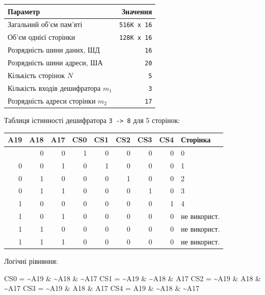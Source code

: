 \documentclass[
  11pt,
]{article}
\newenvironment{Shaded}{}{}
\newcommand{\NormalTok}[1]{#1}
\newcounter{none} %
\begin{document}
\begin{enumerate}
  {\def\LTcaptype{none}
  \begin{longtable}[]{@{}lr@{}}
  \toprule\noalign{}
  Параметр & Значення \\
  \midrule\noalign{}
  \endhead
  \bottomrule\noalign{}
  \endlastfoot
  Загальний об'єм пам'яті & \texttt{516K\ x\ 16} \\
  Об'єм однієї сторінки & \texttt{128K\ x\ 16} \\
  Розрядність шини даних, ШД & \texttt{16} \\
  Розрядність шини адреси, ША & \texttt{20} \\
  Кількість сторінок \(N\) & \texttt{5} \\
  Кількість входів дешифратора \(m_1\) & \texttt{3} \\
  Розрядність адреси сторінки \(m_2\) & \texttt{17} \\
  \end{longtable}
  }

  Таблиця істинності дешифратора \texttt{3\ -\textgreater{}\ 8} для 5 сторінок:

  {\def\LTcaptype{none} %
  \begin{longtable}[]{@{}rrrrrrrrl@{}}
  \toprule\noalign{}
  A19 & A18 & A17 & CS0 & CS1 & CS2 & CS3 & CS4 & Сторінка \\
  \midrule\noalign{}
  \endhead
  \bottomrule\noalign{}
  \endlastfoot
  0 & 0 & 0 & 1 & 0 & 0 & 0 & 0 & 0 \\
  0 & 0 & 1 & 0 & 1 & 0 & 0 & 0 & 1 \\
  0 & 1 & 0 & 0 & 0 & 1 & 0 & 0 & 2 \\
  0 & 1 & 1 & 0 & 0 & 0 & 1 & 0 & 3 \\
  1 & 0 & 0 & 0 & 0 & 0 & 0 & 1 & 4 \\
  1 & 0 & 1 & 0 & 0 & 0 & 0 & 0 & не використ. \\
  1 & 1 & 0 & 0 & 0 & 0 & 0 & 0 & не використ. \\
  1 & 1 & 1 & 0 & 0 & 0 & 0 & 0 & не використ. \\
  \end{longtable}
  }

  Логічні рівняння:

\begin{Shaded}
\begin{Highlighting}[]
\NormalTok{CS0 = \textasciitilde{}A19 \& \textasciitilde{}A18 \& \textasciitilde{}A17}
\NormalTok{CS1 = \textasciitilde{}A19 \& \textasciitilde{}A18 \&  A17}
\NormalTok{CS2 = \textasciitilde{}A19 \&  A18 \& \textasciitilde{}A17}
\NormalTok{CS3 = \textasciitilde{}A19 \&  A18 \&  A17}
\NormalTok{CS4 =  A19 \& \textasciitilde{}A18 \& \textasciitilde{}A17}
\end{Highlighting}
  \end{Shaded}


\end{enumerate}
\end{document}
